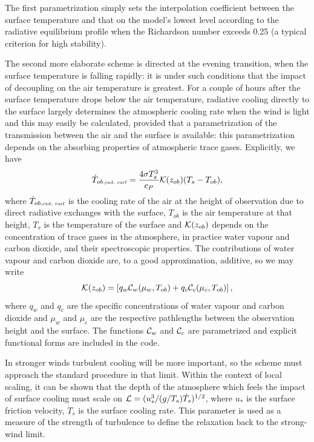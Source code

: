 \documentclass{UMDP_article}
\begin{document}
The first parametrization simply sets the interpolation coefficient
between the surface temperature and that on the model's lowest level
according to the radiative equilibrium profile when the Richardson
number exceeds 0.25 (a typical criterion for high stability).

The second more elaborate scheme is directed at the evening
transition, when the surface temperature is falling rapidly: it is
under such conditions that the impact of decoupling on the air
temperature is greatest. For a couple of hours after the surface
temperature drops below the air temperature, radiative cooling
directly to the surface largely determines the atmospheric cooling
rate when the wind is light and this may easily be calculated,
provided that a parametrization of the transmission between the air
and the surface is available: this parametrization depends on the
absorbing properties of atmospheric trace gases.  Explicitly, we have
\begin{equation}
  \dot T_{ob, \mbox{\tiny rad, surf}} = \frac{4\sigma T_s^3}{c_P}  
  {\cal K}(z_{ob}) (T_s-T_{ob}),
\end{equation}
where $\dot T_{ob, \mbox{\tiny rad, surf}}$ is the cooling rate of the
air at the height of observation due to direct radiative exchanges
with the surface, $T_{ob}$ is the air temperature at that height,
$T_s$ is the temperature of the surface and ${\cal K}(z_{ob})$ depends
on the concentration of trace gases in the atmosphere, in practice
water vapour and carbon dioxide, and their spectroscopic
properties. The contributions of water vapour and carbon dioxide are,
to a good approximation, additive, so we may write
\begin{equation}
  {\cal K}(z_{ob}) = \left [ q_w {\cal C}_w(\mu_w,
    T_{ob}) + q_c {\cal C}_c(\mu_c, T_{ob}) \right ],
\end{equation}
where $q_w$ and $q_c$ are the specific concentrations of water vapour
and carbon dioxide and $\mu_w$ and $\mu_c$ are the respective
pathlengths between the observation height and the surface. The
functions ${\cal C}_w$ and ${\cal C}_c$ are parametrized and explicit
functional forms are included in the code.

In stronger winds turbulent cooling will be more important, so the
scheme must approach the standard procedure in that limit. Within the
context of local scaling, it can be shown that the depth of the
atmosphere which feels the impact of surface cooling must scale on
${\cal L}=(u_*^3/ (g/T_s)\dot T_s)^{1/2}$, where $u_*$ is the surface
friction velocity, $\dot T_s$ is the surface cooling rate. This
parameter is used as a measure of the strength of turbulence to define
the relaxation back to the strong-wind limit.
\end{document}
